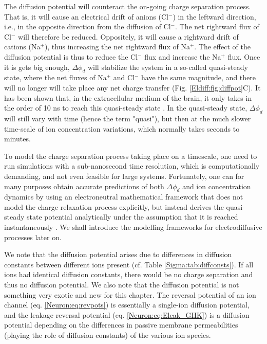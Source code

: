 The diffusion potential will counteract the on-going charge separation process. That is, it will cause an electrical drift of anions (Cl$^-$) in the leftward direction, i.e., in the opposite direction from the diffusion of Cl$^-$. The net rightward flux of Cl$^-$ will therefore be reduced. Oppositely, it will cause a rightward drift of cations (Na$^+$), thus increasing the net rightward flux of Na$^+$. The effect of the diffusion potential is thus to reduce the Cl$^-$ flux and increase the Na$^+$ flux. Once it is gets big enough, $\Delta \phi_d$ will stabilize the system in a so-called quasi-steady state, where the net fluxes of Na$^+$ and Cl$^-$ have the same magnitude, and there will no longer will take place any net charge transfer (Fig. \ref{Eldiff:fig:diffpot}C). It has been shown that, in the extracellular medium of the brain, it only takes in the order of 10 ns to reach this quasi-steady state \citep{Solbra2018}. In the quasi-steady state, $\Delta \phi_d$ will still vary with time (hence the term "quasi"), but then at the much slower time-scale of ion concentration variations, which normally takes seconds to minutes.

To model the charge separation process taking place on a timescale, one need to run simulations with a sub-nanosecond time resolution, which is computationally demanding, and not even feasible for large systems. Fortunately, one can for many purposes obtain accurate predictions of both $\Delta \phi_d$ and ion concentration dynamics by using an electroneutral mathematical framework that does not model the charge relaxation process explicitly, but instead derives the quasi-steady state potential analytically under the assumption that it is reached instantaneously \citep{Solbra2018}. We shall introduce the modelling frameworks for electrodiffusive processes later on.

We note that the diffusion potential arises due to differences in diffusion constants between different ions present  (cf. Table \ref{Sigma:tab:diffconsts}). If all ions had identical diffusion constants, there would be no charge separation and thus no diffusion potential. We also note that the diffusion potential is not something very exotic and new for this chapter. The reversal potential of an ion channel (eq. \ref{Neuron:eq:revpots}) is essentially a single-ion diffusion potential, and the leakage reversal potential (eq. \ref{Neuron:eq:Eleak_GHK}) is a diffusion potential depending on the differences in passive membrane permeabilities (playing the role of diffusion constants) of the various ion species.

